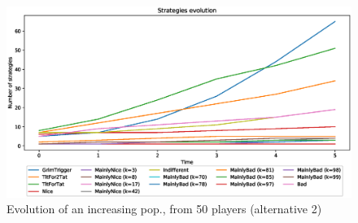 \documentclass[journal,10pt,twoside]{IEEEtran}
\begin{document}
\begin{figure}
    \centering
    \includegraphics[width=.7\columnwidth]{../img/ripdmp-incr/alt2/ripdmp-evolution-increasing-pop-50}
    \caption{Evolution of an increasing pop., from 50 players (alternative 2)}
    \label{fig:incrRa2}
\end{figure}



\end{document}
